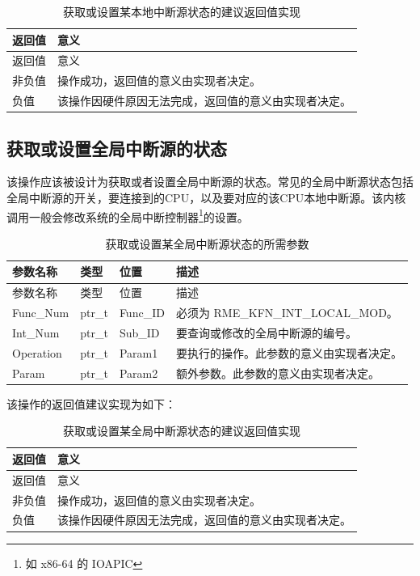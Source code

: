 \begin{xltabular}{\textwidth}{@{}>{\hsize\raggedright\arraybackslash}X>{\hsize\raggedright\arraybackslash}X@{}}
\caption{获取或设置某本地中断源状态的建议返回值实现}\label{tab:8-17-get-or-set-local-interrupt-source-state-suggested-return-values}\\
\toprule
返回值 & 意义\tabularnewline
\endfirsthead
\toprule
返回值 & 意义\tabularnewline
\midrule
\endhead
\bottomrule
\endlastfoot
    非负值 & 操作成功，返回值的意义由实现者决定。\tabularnewline
    负值 & 该操作因硬件原因无法完成，返回值的意义由实现者决定。\tabularnewline
\end{xltabular}

\subsection{获取或设置全局中断源的状态}\label{subsec:8-get-or-set-global-interrupt-source-state}

该操作应该被设计为获取或者设置全局中断源的状态。常见的全局中断源状态包括全局中断源的开关，要连接到的CPU，以及要对应的该CPU本地中断源。该内核调用一般会修改系统的全局中断控制器\footnote{如 x86-64 的 IOAPIC}的设置。

\begin{xltabular}{\textwidth}{@{}>{\hsize\raggedright\arraybackslash}X>{\hsize\raggedright\arraybackslash}X>{\hsize\raggedright\arraybackslash}X>{\hsize\raggedright\arraybackslash}X@{}}
\caption{获取或设置某全局中断源状态的所需参数}\label{tab:8-18-get-or-set-global-interrupt-source-state-parameters}\\
\toprule
参数名称 & 类型 & 位置 & 描述\tabularnewline
\endfirsthead
\toprule
参数名称 & 类型 & 位置 & 描述\tabularnewline
\midrule
\endhead
\bottomrule
\endlastfoot
Func\_Num & ptr\_t & Func\_ID & 必须为 RME\_KFN\_INT\_LOCAL\_MOD。\tabularnewline
Int\_Num & ptr\_t & Sub\_ID &
要查询或修改的全局中断源的编号。\tabularnewline
Operation & ptr\_t & Param1 &
要执行的操作。此参数的意义由实现者决定。\tabularnewline
Param & ptr\_t & Param2 &
额外参数。此参数的意义由实现者决定。\tabularnewline
\end{xltabular}

该操作的返回值建议实现为如下：

\begin{xltabular}{\textwidth}{@{}>{\hsize\raggedright\arraybackslash}X>{\hsize\raggedright\arraybackslash}X@{}}
\caption{获取或设置某全局中断源状态的建议返回值实现}\label{tab:8-19-get-or-set-global-interrupt-source-state-suggested-return-values}\\
\toprule
返回值 & 意义\tabularnewline
\endfirsthead
\toprule
返回值 & 意义\tabularnewline
\midrule
\endhead
\bottomrule
\endlastfoot
    非负值 & 操作成功，返回值的意义由实现者决定。\tabularnewline
    负值 & 该操作因硬件原因无法完成，返回值的意义由实现者决定。\tabularnewline
\end{xltabular}

